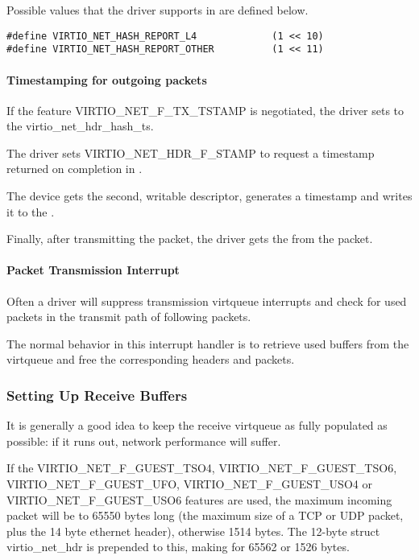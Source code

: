 Possible values that the driver supports in  are defined below.

\begin{lstlisting}
#define VIRTIO_NET_HASH_REPORT_L4             (1 << 10)
#define VIRTIO_NET_HASH_REPORT_OTHER          (1 << 11)
\end{lstlisting}

\paragraph{Timestamping for outgoing packets}
\label{sec:Device Types / Network Device / Device Operation / Packet Transmission / Timestamping for outgoing packets}

If the feature VIRTIO_NET_F_TX_TSTAMP is negotiated, the driver sets  to the virtio_net_hdr_hash_ts.

The driver sets VIRTIO_NET_HDR_F_STAMP to request a timestamp returned on completion in .

The device gets the second, writable descriptor, generates a timestamp and writes it to the .

Finally, after transmitting the packet, the driver gets the  from the packet.

\paragraph{Packet Transmission Interrupt}\label{sec:Device Types / Network Device / Device Operation / Packet Transmission / Packet Transmission Interrupt}

Often a driver will suppress transmission virtqueue interrupts
and check for used packets in the transmit path of following
packets.

The normal behavior in this interrupt handler is to retrieve
used buffers from the virtqueue and free the corresponding
headers and packets.

\subsubsection{Setting Up Receive Buffers}\label{sec:Device Types / Network Device / Device Operation / Setting Up Receive Buffers}

It is generally a good idea to keep the receive virtqueue as
fully populated as possible: if it runs out, network performance
will suffer.

If the VIRTIO_NET_F_GUEST_TSO4, VIRTIO_NET_F_GUEST_TSO6,
VIRTIO_NET_F_GUEST_UFO, VIRTIO_NET_F_GUEST_USO4 or VIRTIO_NET_F_GUEST_USO6
features are used, the maximum incoming packet
will be to 65550 bytes long (the maximum size of a
TCP or UDP packet, plus the 14 byte ethernet header), otherwise
1514 bytes.  The 12-byte struct virtio_net_hdr is prepended to this,
making for 65562 or 1526 bytes.

